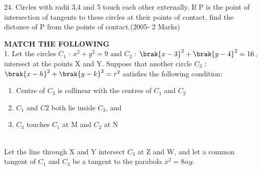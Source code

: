\documentclass[journal,12pt,twocolumn]{IEEEtran}
\theoremstyle{remark}
\begin{document}
24. Circles with radii 3,4 and 5 touch each other externally. If P is the point of intersection of tangents to these circles at their points of contact, find the distance of P from the points of contact.\hfill(2005- 2 Marks)\\ 
\newpage

\textbf{MATCH THE FOLLOWING}\\



1. Let the circles $C_{1}$ : $x^2+y^2=9$ and $C_{2}$ : $\brak{x-3}^2+\brak{y-4}^2 = 16$, intersect at the points X and Y. Suppose that another circle $C_{3}$ : $\brak{x-h}^2+\brak{y-k}^2=r^2$ satisfies the following condition:\\
 
 
 \begin{enumerate}[label=(\roman*)]
 \item Centre of $C_{3}$ is collinear with the centres of $C_{1}$ and $C_{2}$
 \item $C_{1}$ and $C{2}$ both lie inside $C_{3}$, and

 \item $C_{3}$ touches $C_{1}$ at M and $C_{2}$ at N
\end{enumerate}\\
Let the line through X and Y intersect $C_{3}$ at Z and W, and let a common tangent of $C_{1}$ and $C_{3}$ be a tangent to the parabola $x^2=8\alpha y.$\\
\end{document}
